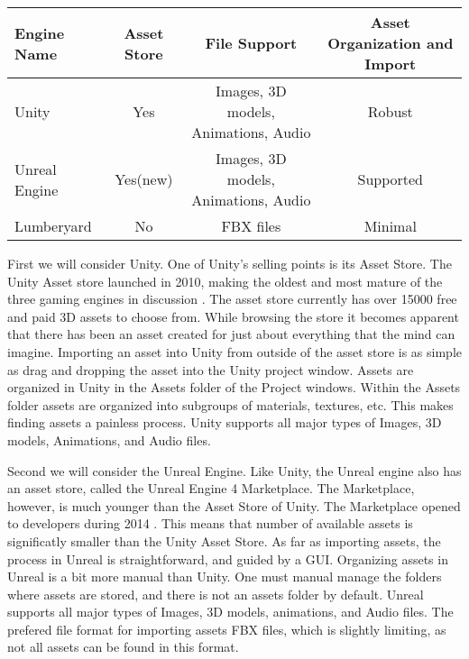 \documentclass[10pt,journal,compsoc,onecolumn, draftclsnofoot]{IEEEtran}
\begin{document}
\vspace{2mm}
\begin{table}[h!]
\centering
  \begin{tabular}{ | l || c | c | c | }
  \hline
  Engine Name & Asset Store & File Support & Asset Organization and Import\\
  \hline
  Unity & Yes & Images, 3D models, Animations, Audio & Robust\\ \hline
  Unreal Engine & Yes(new) & Images, 3D models, Animations, Audio & Supported\\ \hline
  Lumberyard & No & FBX files & Minimal\\ \hline
  \end{tabular}
\end{table}
\vspace{2mm}

First we will consider Unity.
One of Unity's selling points is its Asset Store.
The Unity Asset store launched in 2010, making the oldest and most mature of the three gaming engines in discussion \cite{unity_store_age}.
The asset store currently has over 15000 free and paid 3D assets to choose from.
While browsing the store it becomes apparent that there has been an asset created for just about everything that the mind can imagine.
Importing an asset into Unity from outside of the asset store is as simple as drag and dropping the asset into the Unity project window.
Assets are organized in Unity in the Assets folder of the Project windows.
Within the Assets folder assets are organized into subgroups of materials, textures, etc.
This makes finding assets a painless process.
Unity supports all major types of Images, 3D models, Animations, and Audio files.

Second we will consider the Unreal Engine.
Like Unity, the Unreal engine also has an asset store, called the Unreal Engine 4 Marketplace.
The Marketplace, however, is much younger than the Asset Store of Unity.
The Marketplace opened to developers during 2014 \cite{unreal_marketplace_date}.
This means that number of available assets is significatly smaller than the Unity Asset Store.
As far as importing assets, the process in Unreal is straightforward, and guided by a GUI.
Organizing assets in Unreal is a bit more manual than Unity.
One must manual manage the folders where assets are stored, and there is not an assets folder by default.
Unreal supports all major types of Images, 3D models, animations, and Audio files.
The prefered file format for importing assets FBX files, which is slightly limiting, as not all assets can be found in this format.
\end{document}
